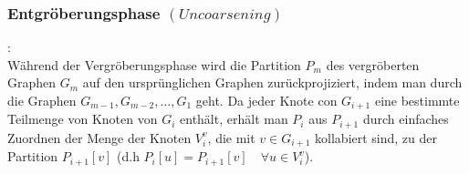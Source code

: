 \documentclass[runningheads]{llncs}
\begin{document}
\subsubsection{Entgröberungsphase $(Uncoarsening)$}:\\[8pt]
Während der Vergröberungsphase wird die Partition $P_m$ des vergröberten Graphen $G_m$ auf den ursprünglichen Graphen zurückprojiziert, indem man durch die Graphen $G_{m-1}, G_{m-2}, \ldots, G_1$ geht. Da jeder Knote con $G_{i+1}$ eine bestimmte Teilmenge von Knoten von $G_i$ enthält, erhält man $P_i$ aus $P_{i+1}$ durch einfaches Zuordnen der Menge der Knoten $V_{i}^{v}$, die mit $v \in G_{i+1}$ kollabiert sind, zu der Partition $P_{i+1}[v]$ (d.h $P_{i}[u] = P_{i+1}[v] \quad \forall u \in V_{i}^{v}$).   
\end{document}

